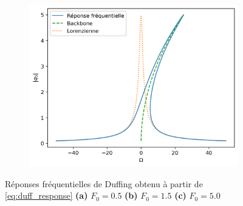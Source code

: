 \begin{figure}
\begin{subfigure}[b]{0.31\textwidth}
         \includegraphics[width=\textwidth]{images/duffing/notitle_F0=5.0.png}
         \caption{}
         \label{fig:duff_freq_resp_3}
     \end{subfigure} 
    
    \caption{Réponses fréquentielles de Duffing obtenu à partir de \eqref{eq:duff_response} \textbf{(a)} $F_0=0.5$ \textbf{(b)} $F_0=1.5$ \textbf{(c)} $F_0=5.0$}
    \label{fig:duff_freq_resp_all}
\end{figure}


